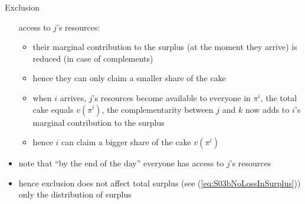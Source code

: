 \documentclass[11pt,english]{beamer}
\begin{document}
\begin{frame}[allowframebreaks]{Exclusion}
\begin{itemize}
      access to $j$'s resources:
      \begin{itemize}
      \item their marginal contribution to the surplus (at the moment
        they arrive) is reduced (in case of complements)
      \item hence they can only claim a smaller share of the cake
      \item when $i$ arrives, $j$'s resources become available to
        everyone in $\pi^i$, the total cake equals $v(\pi^i)$, the
        complementarity between $j$ and $k$ now adds to $i$'s marginal
        contribution to the surplus
      \item hence $i$ can claim a bigger share of the cake $v(\pi^i)$
      \end{itemize}
    \item note that ``by the end of the day'' everyone has access to
      $j$'s resources
    \item hence exclusion does not affect total surplus (see
      (\ref{eq:S03bNoLossInSurplus})) only the distribution of surplus
  \end{itemize}
\end{frame}
\end{document}
